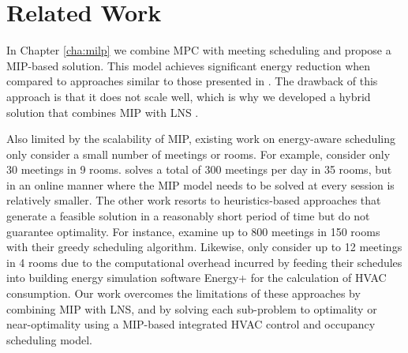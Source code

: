 \section{Related Work}\label{sec:related_work}

In Chapter \ref{cha:milp} we combine MPC with meeting scheduling and propose a MIP-based solution. This model achieves significant energy reduction when compared to approaches similar to those presented in \cite{goyal2013occupancy,kwak2013tesla,majumdar2012energy}. The drawback of this approach is that it does not scale well, which is why we developed a hybrid solution that combines MIP with LNS \citep{lim2015large}. %

Also limited by the scalability of MIP, existing work on energy-aware scheduling only consider a small number of meetings or rooms. For example, \cite{chai2014minimizing} consider only 30 meetings in 9 rooms. \cite{kwak2013tesla} solves a total of 300 meetings per day in 35 rooms, but in an online manner where the MIP model needs to be solved at every session is relatively smaller. The other work resorts to heuristics-based approaches that generate a feasible solution in a reasonably short period of time but do not guarantee optimality. For instance, \cite{pan2013minimizing} examine up to 800 meetings in 150 rooms with their greedy scheduling algorithm. Likewise, \cite{majumdar2016characterising} only consider up to 12 meetings in 4 rooms due to the computational overhead incurred by feeding their schedules into building energy simulation software Energy+ \citep{crawley2000energyplus} for the calculation of HVAC consumption. Our work overcomes the limitations of these approaches by combining MIP with LNS, and by solving each sub-problem to optimality or near-optimality using a MIP-based integrated HVAC control and occupancy scheduling model. %

